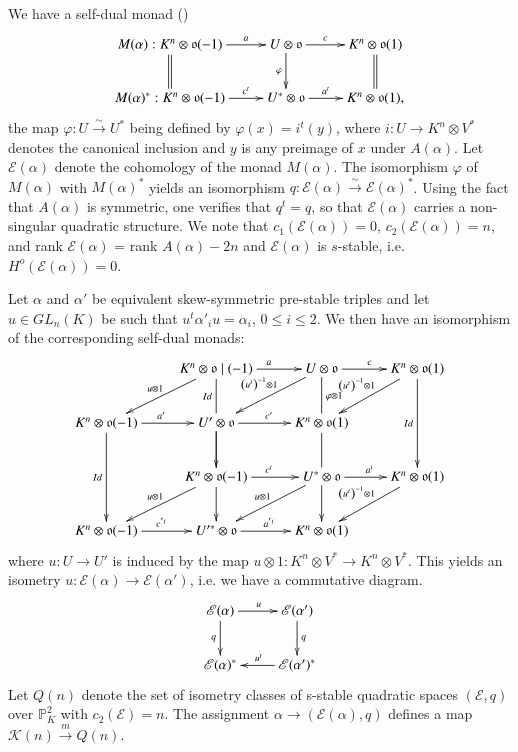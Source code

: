 We have a self-dual monad (\cite[p.10]{key2})
$$
\xymatrix{M(\alpha):K^{n}\ar@{=}[d]\otimes \mathfrak{o}(-1)\ar[r]^-{a}&U\otimes\ar[d]_{\varphi} \mathfrak{o}\ar[r]^-{c}&K^{n}\ar@{=}[d]\otimes \mathfrak{o}(1)\\
M(\alpha)^{\ast}:K^{n}\otimes \mathfrak{o}(-1)\ar[r]^-{c^t}&U^{\ast}\otimes \mathfrak{o}\ar[r]^-{a^t}&K^{n}\otimes \mathfrak{o}(1),}
$$
the map $\varphi:U\xrightarrow{\sim}U^{\ast}$ being defined by $\varphi(x)=i^{t}(y)$, where $i:U\to K^{n}\otimes V^{\ast}$ denotes the canonical inclusion and $y$ is any preimage of $x$ under $A(\alpha)$. Let $\mathscr{E}(\alpha)$ denote the cohomology of the monad $M(\alpha)$. The isomorphism $\varphi$ of $M(\alpha)$ with $M(\alpha)^{\ast}$ yields an isomorphism $q:\mathscr{E}(\alpha)\xrightarrow{\sim}\mathscr{E}(\alpha)^{\ast}$. Using the fact that $A(\alpha)$ is symmetric, one verifies that $q^{t}=q$, so that $\mathscr{E}(\alpha)$ carries a non-singular quadratic structure. We note \cite{key4} that $c_1(\mathscr{E}(\alpha))=0$, $c_2(\mathscr{E}(\alpha))=n$, and rank $\mathscr{E}(\alpha)$ = rank $A(\alpha)-2n$ and $\mathscr{E}(\alpha)$ is $s$-stable, i.e. $H^{o}(\mathscr{E}(\alpha))=0$. 

Let $\alpha$ and $\alpha'$ be equivalent skew-symmetric pre-stable triples and let $u\in GL_n(K)$ be such that $u^{t}\alpha'_iu=\alpha_i$, $0\leq i\leq 2$. We then have an isomorphism of the corresponding self-dual monads: 
$$
\xymatrix{&K^{n}\ar[dl]_{u\otimes 1}\otimes\mathfrak{o}\mid(-1)\ar@{-}[d]_{Id}\ar[r]^{a}&U\ar[dl]_-{\left(u^{t}\right)^{-1}\otimes 1}\otimes\ar@{-}[d]^{\varphi \otimes 1}\mathfrak{o}\ar[r]^{c}& K^{n}\otimes \mathfrak{o}\ar[dl]_{\left(u^{t}\right)^{-1}\otimes 1}\ar@{->}[dd]_{Id}(1)\\
K^{n}\otimes \mathfrak{o}(-1)\ar@{->}[dd]_{Id}\ar[r]^{a'}&U'\otimes\ar@{-}[d] \mathfrak{o}\ar[r]^{c'}\ar[d]&K^{n}\otimes \mathfrak{o}\ar@{-}[d](1)\\
& K^{n}\otimes\ar[dl]_{u\otimes 1} \mathfrak{o}(-1)\ar[r]^{c^{t}}\ar[d]&U^{\ast}\ar[dl]_{u\otimes 1}\otimes \mathfrak{o}\ar[r]^{a^{t}}\ar[d]&K^{n}\otimes\ar[dl]_{\left(u^{t}\right)^{-1}\otimes 1} \mathfrak{o}(1)\\
K^{n}\otimes \mathfrak{o}(-1)\ar[r]^{c^{'t}}&U'^{\ast}\otimes\mathfrak{o} \ar[r]^{a^{'t}}& K^{n}\otimes \mathfrak{o}(1)}
$$
\pageoriginale
where $u:U\to U'$ is induced by the map $u\otimes 1: K^{n}\otimes V^{\ast}\to K^{n}\otimes V^{\ast}$. This yields an isometry $u:\mathscr{E}(\alpha)\to \mathscr{E}(\alpha')$, i.e. we have a commutative diagram. 
$$
\xymatrix{\mathscr{E}(\alpha)\ar[d]_{q}\ar[r]^{u}&\mathscr{E}(\alpha')\ar[d]^{q}\\
\mathscr{E}(\alpha)^{\ast}&\ar[l]_{u^{t}}\mathscr{E}(\alpha')^{\ast}}
$$
Let $Q(n)$ denote the set of isometry classes of s-stable quadratic spaces $(\mathscr{E},q)$ over $\mathbb{P}^{2}_K$ with $c_2(\mathscr{E})=n$. The assignment $\alpha\to(\mathscr{E}(\alpha),q)$ defines a map $\mathscr{K}(n)\xrightarrow{m}Q(n)$. 

